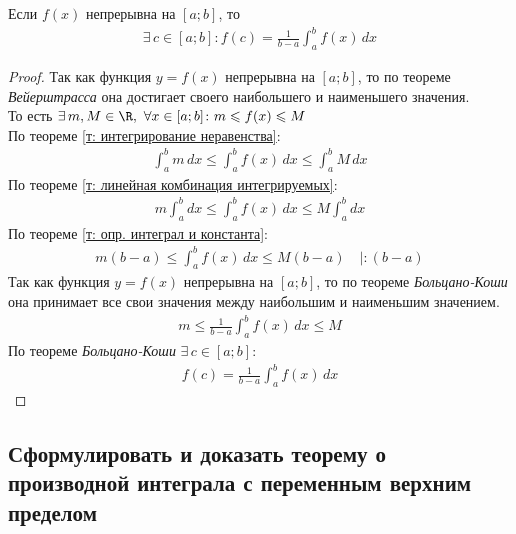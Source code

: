 \begin{theorem}
    Если $f(x)$ непрерывна на $[a;b]$, то
    \begin{gather*}
        \exists\, c \in [a;b]\colon f(c) = \frac{1}{b-a} \int_{a}^{b} f(x)\, dx
    \end{gather*}
\end{theorem}
\begin{proof}
    Так как функция $y=f(x)$ непрерывна на $[a;b]$, то по теореме \textit{Вейерштрасса} она достигает своего наибольшего и наименьшего значения. \\
    То есть $\exists\, m, M \in \R,\ \forall x \in [a;b]\colon m \leqslant f(x) \leqslant M$ \\
    По теореме \ref{т: интегрирование неравенства}:
    \begin{gather*}
        \int_{a}^{b} m\, dx \leqslant \int_{a}^{b} f(x)\, dx \leqslant \int_{a}^{b} M\, dx
    \end{gather*}
    По теореме \ref{т: линейная комбинация интегрируемых}:
    \begin{gather*}
        m \int_{a}^{b} dx \leqslant \int_{a}^{b} f(x)\, dx \leqslant M \int_{a}^{b} dx
    \end{gather*}
    По теореме \ref{т: опр. интеграл и константа}:
    \begin{gather*}
        m(b-a) \leqslant \int_{a}^{b} f(x)\, dx \leqslant M(b-a)\quad | : (b-a)
    \end{gather*}
    Так как функция $y=f(x)$ непрерывна на $[a;b]$, то по теореме \textit{Больцано-Коши} она принимает все свои значения между наибольшим и наименьшим значением.
    \begin{gather*}
        m \leqslant \frac{1}{b-a} \int_{a}^{b} f(x)\, dx \leqslant M
    \end{gather*}
    По теореме \textit{Больцано-Коши} $\exists\, c \in [a;b]\colon$
    \begin{gather*}
        f(c) = \frac{1}{b-a} \int_{a}^{b} f(x)\, dx
    \end{gather*}
\end{proof}

\subsection{Сформулировать и доказать теорему о производной интеграла с переменным верхним пределом}

